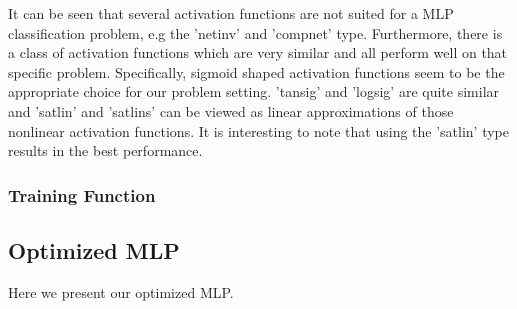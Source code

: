 It can be seen that several activation functions are not suited for a MLP classification problem, e.g the 'netinv' and 'compnet' type. Furthermore, there is a class of activation functions which are very similar and all perform well on that specific problem. Specifically, sigmoid shaped activation functions seem to be the appropriate choice for our problem setting. 'tansig' and 'logsig' are quite similar and 'satlin' and 'satlins' can be viewed as linear approximations of those nonlinear activation functions. It is interesting to note that using the 'satlin' type results in the best performance.

\FloatBarrier

 \subsubsection{Training Function}
 
\subsection{Optimized MLP}

Here we present our optimized MLP.
